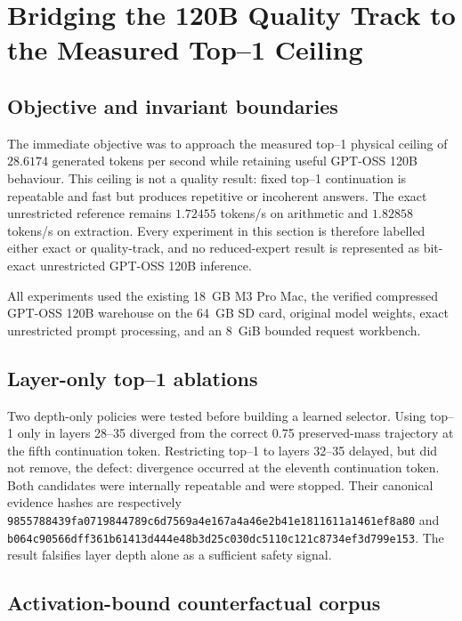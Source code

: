 \section{Bridging the 120B Quality Track to the Measured Top--1 Ceiling}
\label{sec:gptoss120b-quality-ceiling-bridge}

\subsection{Objective and invariant boundaries}

The immediate objective was to approach the measured top--1 physical ceiling of
$28.6174$ generated tokens per second while retaining useful GPT-OSS 120B
behaviour.  This ceiling is not a quality result: fixed top--1 continuation is
repeatable and fast but produces repetitive or incoherent answers.  The exact
unrestricted reference remains $1.72455$ tokens/s on arithmetic and $1.82858$
tokens/s on extraction.  Every experiment in this section is therefore labelled
either exact or quality-track, and no reduced-expert result is represented as
bit-exact unrestricted GPT-OSS 120B inference.

All experiments used the existing 18~GB M3 Pro Mac, the verified compressed
GPT-OSS 120B warehouse on the 64~GB SD card, original model weights, exact
unrestricted prompt processing, and an 8~GiB bounded request workbench.

\subsection{Layer-only top--1 ablations}

Two depth-only policies were tested before building a learned selector.  Using
top--1 only in layers 28--35 diverged from the correct 0.75 preserved-mass
trajectory at the fifth continuation token.  Restricting top--1 to layers
32--35 delayed, but did not remove, the defect: divergence occurred at the
eleventh continuation token.  Both candidates were internally repeatable and
were stopped.  Their canonical evidence hashes are respectively
\texttt{9855788439fa0719844789c6d7569a4e167a4a46e2b41e1811611a1461ef8a80}
and
\texttt{b064c90566dff361b61413d444e48b3d25c030dc5110c121c8734ef3d799e153}.
The result falsifies layer depth alone as a sufficient safety signal.

\subsection{Activation-bound counterfactual corpus}

